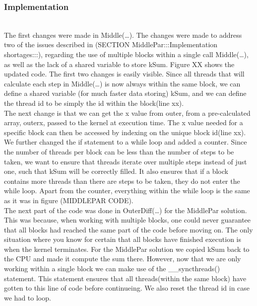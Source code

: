 \subsubsection{Implementation} \hfill \\

The first changes were made in Middle(…). The changes were made to address two of the issues described in (SECTION MiddlePar:::Implementation shortages:::), regarding the use of multiple blocks within a single call Middle(…), as well as the lack of a shared variable to store kSum. Figure XX shows the updated code. The first two changes is easily  visible. Since all threads that will calculate each step in Middle(…) is now always within the same block, we can define a shared variable (for much faster data storing) kSum, and we can define the thread id to be simply the id within the block(line xx).\\

The next change is that we can get the x value from outer, from a pre-calculated array, outerx, passed to the kernel at execution time. The x value needed for a specific block can then be accessed by indexing on the unique block id(line xx).\\

We further changed the if statement to a while loop and added a counter. Since the number of threads per block can be less than the number of steps to be taken, we want to ensure that threads iterate over multiple steps instead of just one, such that kSum will be correctly filled. It also ensures that if a block contains more threads than there are steps to be taken, they do not enter the while loop. Apart from the counter, everything within the while loop is the same as it was in figure (MIDDLEPAR CODE).\\

The next part of the code was done in OuterDiff(…) for the MiddlePar solution. This was because, when working with multiple blocks, one could never guarantee that all blocks had reached the same part of the code before moving on. The only situation where you know for certain that all blocks have finished execution is when the kernel terminates. For the MiddlePar solution we copied kSum back to the CPU and made it compute the sum there. However, now that we are only working within a single block we can make use of the \_\_syncthreads() statement. This statement ensures that all threads(within the same block) have gotten to this line of code before continueing. We also reset the thread id in case we had to loop. \\

